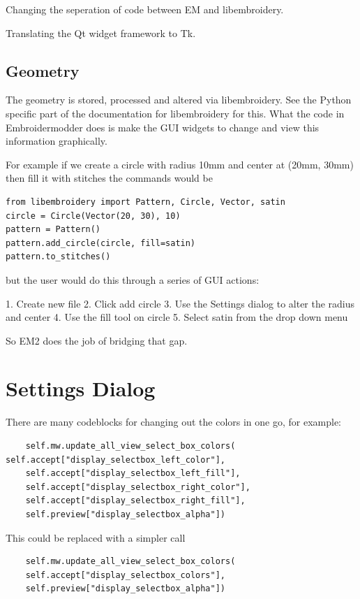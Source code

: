 \documentclass[10pt]{report}
\begin{document}
Changing the seperation of code between EM and libembroidery.

Translating the Qt widget framework to Tk.

\subsection{Geometry}

The geometry is stored, processed and altered via libembroidery. See the Python
specific part of the documentation for libembroidery for this. What the code in
Embroidermodder does is make the GUI widgets to change and view this information
graphically.

For example if we create a circle with radius 10mm and center at (20mm, 30mm)
then fill it with stitches the commands would be

\begin{lstlisting}
from libembroidery import Pattern, Circle, Vector, satin
circle = Circle(Vector(20, 30), 10)
pattern = Pattern()
pattern.add_circle(circle, fill=satin)
pattern.to_stitches()
\end{lstlisting}

but the user would do this through a series of GUI actions:

1. Create new file
2. Click add circle
3. Use the Settings dialog to alter the radius and center
4. Use the fill tool on circle
5. Select satin from the drop down menu

So EM2 does the job of bridging that gap.

\section{Settings Dialog}

There are many codeblocks for changing out the colors in one go, for example:

\begin{lstlisting}
    self.mw.update_all_view_select_box_colors(    self.accept["display_selectbox_left_color"],
    self.accept["display_selectbox_left_fill"],
    self.accept["display_selectbox_right_color"],
    self.accept["display_selectbox_right_fill"],
    self.preview["display_selectbox_alpha"])
\end{lstlisting}

This could be replaced with a simpler call

\begin{lstlisting}
    self.mw.update_all_view_select_box_colors(
    self.accept["display_selectbox_colors"],
    self.preview["display_selectbox_alpha"])
\end{lstlisting}
\end{document}
